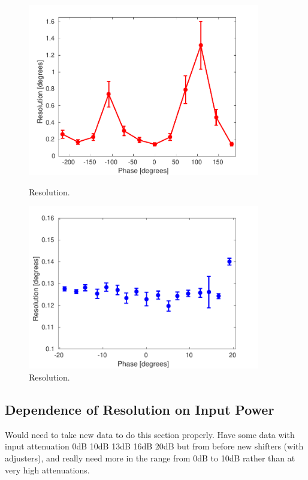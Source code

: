 \begin{figure}
  \centering
  \includegraphics[width=0.9\textwidth]{Figures/phaseMons/resolutionVsShifter}
  \caption{Resolution.}
  \label{f:resolutionVsShifter}
  \includegraphics[width=0.9\textwidth]{Figures/phaseMons/resVsSmallPhasOff}
  \caption{Resolution.}
  \label{f:resVsSmallPhasOff}
\end{figure}

\subsection{Dependence of Resolution on Input Power}
\label{ss:resVsPower}

Would need to take new data to do this section properly. Have some data with input attenuation 0dB 10dB 13dB 16dB 20dB but from before new shifters (with adjusters), and really need more in the range from 0dB to 10dB rather than at very high attenuations.

